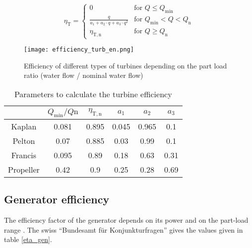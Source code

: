 \begin{equation}
 \label{eq_eff}
\eta_\mathrm{T}= \left\{
    \begin{array}{ll}
	0 & \mbox{for } Q \leq Q_\mathrm{min}\\
        \frac{q}{a_\mathrm{1}+a_\mathrm{2} \cdot q + a_\mathrm{3} \cdot q^2} & \mbox{for } Q_\mathrm{min}<Q<Q_\mathrm{n} \\
        \eta_\mathrm{T,n} & \mbox{for } Q \geq Q_\mathrm{n}
    \end{array}
\right.
\end{equation}


\begin{figure}[H]
\texttt{[image: efficiency\_turb\_en.png]}
\caption[Efficiency of different types of turbines depending on the part load ratio]{Efficiency of different types of turbines depending on the part load ratio (water flow / nominal water flow) \cite{raa89}}
\centering
\label{efficiency_turb}
\end{figure}


\begin{table}
 \caption[Parameters to calculate the turbine efficiency]{Parameters to calculate the turbine efficiency \cite{quaschning}}
 \label{eff_param}
 \centering
 \begin{tabular}{|c|c|c|c|c|c|}
  \cline{2-6}
  \multicolumn{1}{c|}{}&$Q_\mathrm{min} / Q\mathrm{n}$ & $\eta_\mathrm{T,n}$& $a_\mathrm{1}$ & $a_\mathrm{2}$&$a_\mathrm{3}$ \\ 
  \hline
  Kaplan & 0.081& 0.895& 0.045 &0.965& 0.1 \\
  Pelton & 0.07& 0.885& 0.03& 0.99& 0.1\\
  Francis &0.095 &0.89 &0.18 &0.63 &0.31 \\
  Propeller &0.42 &0.9 &0.25 &0.28 &0.69\\
  \hline
 \end{tabular}
\end{table}

\subsection{Generator efficiency}

The efficiency factor of the generator depends on its power and on the part-load range \cite{pacer}. The swiss ``Bundesamt für Konjunkturfragen'' gives the values given in table \ref{eta_gen}.

